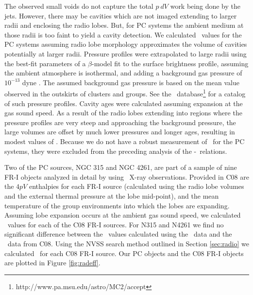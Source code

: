 \documentclass{emulateapj}
\begin{document}
The observed small voids do not capture the total $p~dV$ work being
done by the jets. However, there may be cavities which are not imaged
extending to larger radii and enclosing the radio lobes. But, for PC
systems the ambient medium at those radii is too faint to yield a
cavity detection. We calculated \pcav\ values for the PC systems
assuming radio lobe morphology approximates the volume of cavities
potentially at larger radii. Pressure profiles were extrapolated to
large radii using the best-fit parameters of a $\beta$-model
\citep{betamodel} fit to the surface brightness profile, assuming the
ambient atmosphere is isothermal, and adding a background gas pressure
of $10^{-13}$ dyne \pcmsq. The assumed background gas pressure is
based on the mean value observed in the outskirts of clusters and
groups. See the
\accept\ database\footnote{http://www.pa.msu.edu/astro/MC2/accept} for
a catalog of such pressure profiles. Cavity ages were calculated
assuming expansion at the gas sound speed. As a result of the radio
lobes extending into regions where the pressure profiles are very
steep and approaching the background pressure, the large volumes are
offset by much lower pressures and longer ages, resulting in modest
values of \pcav. Because we do not have a robust measurement of
\pcav\ for the PC systems, they were excluded from the preceding
analysis of the \pjet-\prad\ relations.

Two of the PC sources, NGC 315 and NGC 4261, are part of a sample of
nine FR-I objects analyzed in detail by \citet[][hereafter
  C08]{2008MNRAS.386.1709C} using \xmm\ X-ray observations. Provided
in C08 are the $4pV$ enthalpies for each FR-I source (calculated using
the radio lobe volumes and the external thermal pressure at the lobe
mid-point), and the mean temperature of the group environments into
which the lobes are expanding. Assuming lobe expansion occurs at the
ambient gas sound speed, we calculated \pcav\ values for each of the
C08 FR-I sources. For N315 and N4261 we find no significant difference
between the \pcav\ values calculated using the \chandra\ data and the
\xmm\ data from C08. Using the NVSS search method outlined in Section
\ref{sec:radio} we calculated \phigh\ for each C08 FR-I source. Our PC
objects and the C08 FR-I objects are plotted in Figure
\ref{fig:radeff}.
\end{document}
